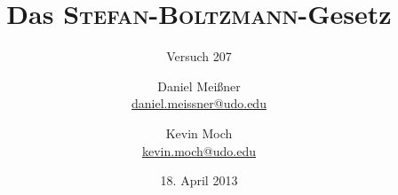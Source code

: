 


\newcommand{\name}[1]{\textsc{#1}}

\titlehead{{TU Dortmund \hfill SS~13\\}
Fakultät Physik\\
Experimentelle Übungen II}

\subject{Versuchsprotokoll}
\title{Das \name{Stefan}-\name{Boltzmann}-Gesetz}
\subtitle{Versuch 207}

\author{Daniel Meißner\\
{\normalsize\url{daniel.meissner@udo.edu}}
\and
Kevin Moch\\
{\normalsize\url{kevin.moch@udo.edu}}}

\date{18. April 2013}


\maketitle

\tableofcontents
\clearpage








\printbibliography
\nocite{v207}

\theappendix


